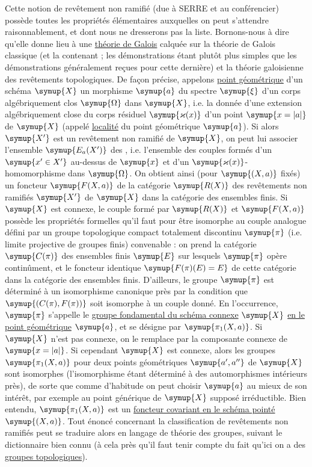 Cette notion de revêtement non ramifié (due à SERRE et au conférencier) possède
toutes les propriétés élémentaires auxquelles on peut s'attendre
raisonnablement, et dont nous ne dresserons pas la liste. Bornons-nous à dire
qu'elle donne lieu à une \uline{théorie de Galois} calquée sur la théorie de Galois
classique (et la contenant ; les démonstrations étant plutôt plus simples que
les démonstrations généralement reçues pour cette dernière) et la théorie
galoisienne des revêtements topologiques. De façon précise, appelons
\uline{point géométrique} d'un schéma $\symup{X}$ un morphisme $\symup{a}$ du spectre $\symup{\xi}$
d'un corps algébriquement clos $\symup{\Omega}$ dans $\symup{X}$, i.e. la donnée d'une
extension algébriquement close du corps résiduel $\symup{\varkappa(x)}$ d'un point
$\symup{x=|a|}$ de $\symup{X}$ (appelé \uline{localité} du point géométrique $\symup{a}$). Si alors
$\symup{X'}$ est un revêtement non ramifié de $\symup{X}$, on peut lui associer l'ensemble
$\symup{E_a(X')}$ des , i.e.
l'ensemble des couples formés d'un $\symup{x'\in X'}$ au-dessus de $\symup{x}$ et d'un
$\symup{\varkappa(x)}$-homomorphisme dans $\symup{\Omega}$. On obtient ainsi
(pour $\symup{(X,a)}$ fixés) un foncteur $\symup{F(X,a)}$ de la catégorie $\symup{R(X)}$ des
revêtements non ramifiés $\symup{X'}$ de $\symup{X}$ dans la catégorie des ensembles finis. Si
$\symup{X}$ est connexe, le couple formé par $\symup{R(X)}$ et $\symup{F(X,a)}$ possède les propriétés
formelles qu'il faut pour être isomorphe au couple analogue défini par un
groupe topologique compact totalement discontinu $\symup{\pi}$ (i.e. limite projective
de groupes finis) convenable : on prend la catégorie $\symup{C(\pi)}$ des ensembles
finis $\symup{E}$ sur lesquels $\symup{\pi}$ opère continûment, et le foncteur identique
$\symup{F(\pi)(E)=E}$ de cette catégorie dans la catégorie des ensembles finis.
D'ailleurs, le groupe $\symup{\pi}$ est déterminé à un isomorphisme canonique près par
la condition que $\symup{(C(\pi),F(\pi))}$ soit isomorphe à un couple donné. En
l'occurrence, $\symup{\pi}$ s'appelle le \uline{groupe fondamental du schéma connexe}
$\symup{X}$ \uline{en le point géométrique} $\symup{a}$, et se désigne par $\symup{\pi_1(X,a)}$. Si $\symup{X}$ n'est
pas connexe, on le remplace par la composante connexe de $\symup{x=|a|}$. Si cependant
$\symup{X}$ est connexe, alors les groupes $\symup{\pi_1(X,a)}$ pour deux points géométriques
$\symup{a',a''}$ de $\symup{X}$ sont isomorphes (l'isomorphisme étant déterminé à des
automorphismes intérieurs près), de sorte que comme d'habitude on peut choisir
$\symup{a}$ au mieux de son intérêt, par exemple au point générique de
$\symup{X}$ supposé irréductible. Bien entendu, $\symup{\pi_1(X,a)}$ est un \uline{foncteur covariant en le schéma pointé} $\symup{(X,a)}$. Tout énoncé concernant la classification de
revêtements non ramifiés peut se traduire alors en langage de théorie des groupes,
suivant le dictionnaire bien connu (à cela près qu'il faut tenir compte du fait
qu'ici on a des \uline{groupes topologiques}).

